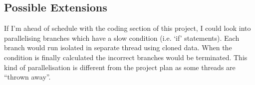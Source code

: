 \documentclass[12pt, a4paper]{article}
\begin{document}
\begin{comment}
\begin{itemize}
	\item Create two plugins, a linter and a syntax extension
	\begin{itemize}
		\item Get the linter plugin to:
		\begin{itemize}
			\item Analyse the programs statements to see what variables each statement depends on and what variables the statement modifies (if any)
			\item Produce a dependency tree for the entire program based on this analysis
			\item Look for areas in the tree which do not depend on one another, these areas could be run in parallel
			\item Estimate the speed of each statement for the dependency tree
			\item Record the areas that could be changed into a file
		\end{itemize}
		\item Get the syntax extension plugin to:
		\begin{itemize}
			\item Read the file the Linter plugin creates
			\item First try one statement in parallel to test it works
			\item Then try to run everything in parallel to test it works
			\item Then
		\end{itemize}
	\end{itemize}
	\item Do some testing
\end{itemize}
\end{comment}

\subsection{Possible Extensions}
If I'm ahead of schedule with the coding section of this project, I could look into parallelising branches which have a slow condition (i.e. `if' statements). Each branch would run isolated in separate thread using cloned data. When the condition is finally calculated the incorrect branches would be terminated. This kind of parallelisation is different from the project plan as some threads are ``thrown away''.
\end{document}
